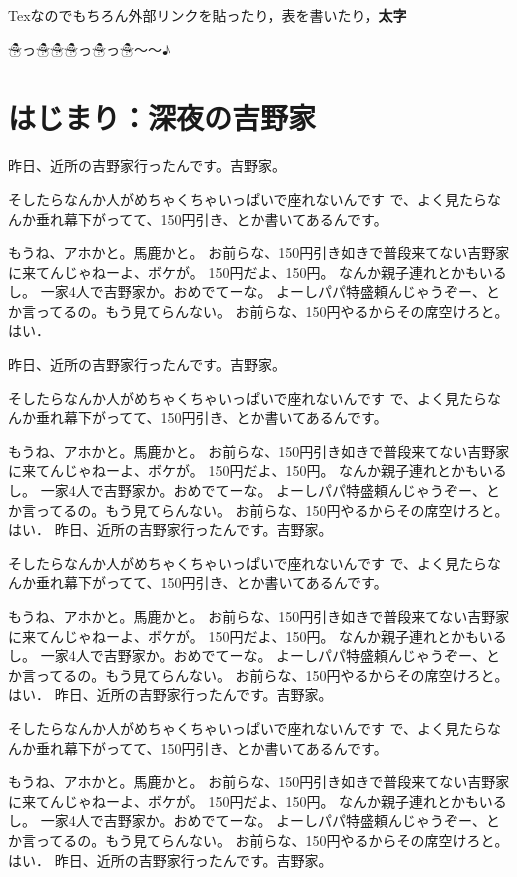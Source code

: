 \documentclass[twocolumn, lualatex, ja=standard]{bxjsarticle}
\begin{document}
Texなのでもちろん外部リンクを貼ったり，表を書いたり，\textbf{太字}

☃っ☃☃☃っ☃っ☃～～♪

\section{はじまり：深夜の吉野家}

昨日、近所の吉野家行ったんです。吉野家。

そしたらなんか人がめちゃくちゃいっぱいで座れないんです
で、よく見たらなんか垂れ幕下がってて、150円引き、とか書いてあるんです。

もうね、アホかと。馬鹿かと。
お前らな、150円引き如きで普段来てない吉野家に来てんじゃねーよ、ボケが。
150円だよ、150円。
なんか親子連れとかもいるし。
一家4人で吉野家か。おめでてーな。
よーしパパ特盛頼んじゃうぞー、とか言ってるの。もう見てらんない。
お前らな、150円やるからその席空けろと。はい．

昨日、近所の吉野家行ったんです。吉野家。

そしたらなんか人がめちゃくちゃいっぱいで座れないんです
で、よく見たらなんか垂れ幕下がってて、150円引き、とか書いてあるんです。

もうね、アホかと。馬鹿かと。
お前らな、150円引き如きで普段来てない吉野家に来てんじゃねーよ、ボケが。
150円だよ、150円。
なんか親子連れとかもいるし。
一家4人で吉野家か。おめでてーな。
よーしパパ特盛頼んじゃうぞー、とか言ってるの。もう見てらんない。
お前らな、150円やるからその席空けろと。はい．
昨日、近所の吉野家行ったんです。吉野家。

そしたらなんか人がめちゃくちゃいっぱいで座れないんです
で、よく見たらなんか垂れ幕下がってて、150円引き、とか書いてあるんです。

もうね、アホかと。馬鹿かと。
お前らな、150円引き如きで普段来てない吉野家に来てんじゃねーよ、ボケが。
150円だよ、150円。
なんか親子連れとかもいるし。
一家4人で吉野家か。おめでてーな。
よーしパパ特盛頼んじゃうぞー、とか言ってるの。もう見てらんない。
お前らな、150円やるからその席空けろと。はい．
昨日、近所の吉野家行ったんです。吉野家。

そしたらなんか人がめちゃくちゃいっぱいで座れないんです
で、よく見たらなんか垂れ幕下がってて、150円引き、とか書いてあるんです。

もうね、アホかと。馬鹿かと。
お前らな、150円引き如きで普段来てない吉野家に来てんじゃねーよ、ボケが。
150円だよ、150円。
なんか親子連れとかもいるし。
一家4人で吉野家か。おめでてーな。
よーしパパ特盛頼んじゃうぞー、とか言ってるの。もう見てらんない。
お前らな、150円やるからその席空けろと。はい．
昨日、近所の吉野家行ったんです。吉野家。
\end{document}
